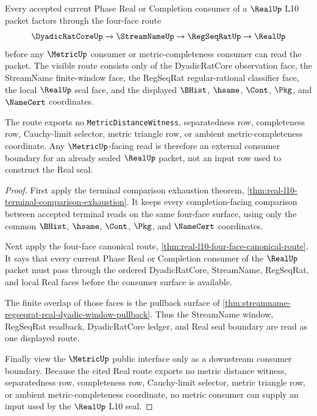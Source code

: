 \begin{theorem}
\label{thm:real-l10-metric-boundary-nonescape}
Every accepted current Phase Real or Completion consumer of a $\RealUp$ L10
packet factors through the four-face route
$$
\DyadicRatCoreUp \to \StreamNameUp \to \RegSeqRatUp \to \RealUp
$$
before any $\MetricUp$ consumer or metric-completeness consumer can read the
packet. The visible route consists only of the DyadicRatCore observation face,
the StreamName finite-window face, the RegSeqRat regular-rational classifier
face, the local $\RealUp$ seal face, and the displayed $\BHist$, $\hsame$,
$\Cont$, $\Pkg$, and $\NameCert$ coordinates.

The route exports no \texttt{MetricDistanceWitness}, separatedness row,
completeness row, Cauchy-limit selector, metric triangle row, or ambient
metric-completeness coordinate. Any $\MetricUp$-facing read is therefore an
external consumer boundary for an already sealed $\RealUp$ packet, not an
input row used to construct the Real seal.
\end{theorem}
\begin{proof}
First apply the terminal comparison exhaustion theorem,
\autoref{thm:real-l10-terminal-comparison-exhaustion}. It keeps every
completion-facing comparison between accepted terminal reads on the same
four-face surface, using only the common $\BHist$, $\hsame$, $\Cont$, $\Pkg$,
and $\NameCert$ coordinates.

Next apply the four-face canonical route,
\autoref{thm:real-l10-four-face-canonical-route}. It says that every current
Phase Real or Completion consumer of the $\RealUp$ packet must pass through
the ordered DyadicRatCore, StreamName, RegSeqRat, and local Real faces before
the consumer surface is available.

The finite overlap of those faces is the pullback surface of
\autoref{thm:streamname-regseqrat-real-dyadic-window-pullback}. Thus the
StreamName window, RegSeqRat readback, DyadicRatCore ledger, and Real seal
boundary are read as one displayed route.

Finally view the $\MetricUp$ public interface only as a downstream consumer
boundary. Because the cited Real route exports no metric distance witness,
separatedness row, completeness row, Cauchy-limit selector, metric triangle
row, or ambient metric-completeness coordinate, no metric consumer can supply
an input used by the $\RealUp$ L10 seal.
\end{proof}

